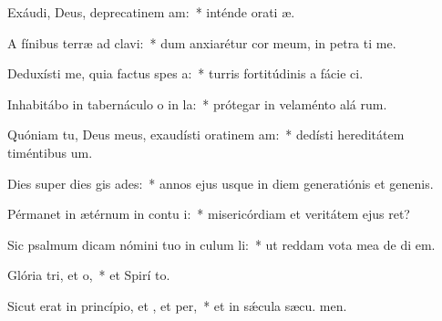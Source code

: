 \item Exáudi, Deus, deprecatinem am:~* inténde orati æ.
\item A fínibus terræ ad  clavi:~* dum anxiarétur cor meum, in petra ti me.
\item Deduxísti me, quia factus  spes a:~* turris fortitúdinis a fácie ci.
\item Inhabitábo in tabernáculo o in la:~* prótegar in velaménto alá rum.
\item Quóniam tu, Deus meus, exaudísti oratinem am:~* dedísti hereditátem timéntibus  um.
\item Dies super dies gis ades:~* annos ejus usque in diem generatiónis et genenis.
\item Pérmanet in ætérnum in contu i:~* misericórdiam et veritátem ejus  ret?
\item Sic psalmum dicam nómini tuo in culum li:~* ut reddam vota mea de di  em.
\item Glória tri, et o,~* et Spirí to.
\item Sicut erat in princípio, et , et per,~* et in sǽcula sæcu. men.

